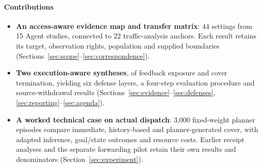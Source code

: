 \paragraph{Contributions}
\begin{itemize}
\item \textbf{An access-aware evidence map and transfer matrix}: 44 settings from 15 Agent studies, connected to 22 traffic-analysis anchors. Each result retains its target, observation rights, population and supplied boundaries (Sections~\ref{sec:scope}--\ref{sec:correspondence}).
\item \textbf{Two execution-aware syntheses}, of feedback exposure and cover termination, yielding six defense layers, a four-step evaluation procedure and source-withdrawal results (Sections~\ref{sec:evidence}--\ref{sec:defenses}, \ref{sec:reporting}--\ref{sec:agenda}).
\item \textbf{A worked technical case on actual dispatch}: 3,000 fixed-weight planner episodes compare immediate, history-based and planner-generated cover, with adapted inference, goal/state outcomes and resource costs. Earlier receipt analyses and the separate forwarding pilot retain their own results and denominators (Section~\ref{sec:experiment}).
\end{itemize}
